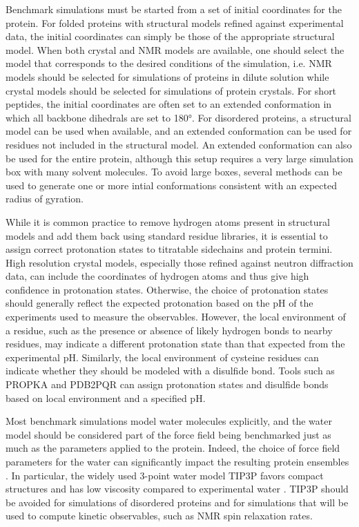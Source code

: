 \documentclass[9pt,review]{livecoms}
\begin{document}
Benchmark simulations must be started from a set of initial coordinates for the protein.
For folded proteins with structural models refined against experimental data, the initial coordinates can simply be those of the appropriate structural model.
When both crystal and NMR models are available, one should select the model that corresponds to the desired conditions of the simulation, i.e. NMR models should be selected for simulations of proteins in dilute solution while crystal models should be selected for simulations of protein crystals.
For short peptides, the initial coordinates are often set to an extended conformation in which all backbone dihedrals are set to \ang{180}.
For disordered proteins, a structural model can be used when available, and an extended conformation can be used for residues not included in the structural model.
An extended conformation can also be used for the entire protein, although this setup requires a very large simulation box with many solvent molecules.
To avoid large boxes, several methods \cite{feldman_fast_2000,feldman_probabilistic_2002,ozenne_flexible-meccano_2012,estana_realistic_2019,ferrie_unified_2020,teixeira_idpconformergenerator_2022} can be used to generate one or more intial conformations consistent with an expected radius of gyration.

While it is common practice to remove hydrogen atoms present in structural models and add them back using standard residue libraries, it is essential to assign correct protonation states to titratable sidechains and protein termini.
High resolution crystal models, especially those refined against neutron diffraction data, can include the coordinates of hydrogen atoms and thus give high confidence in protonation states.
Otherwise, the choice of protonation states should generally reflect the expected protonation based on the pH of the experiments used to measure the observables.
However, the local environment of a residue, such as the presence or absence of likely hydrogen bonds to nearby residues, may indicate a different protonation state than that expected from the experimental pH.
Similarly, the local environment of cysteine residues can indicate whether they should be modeled with a disulfide bond.
Tools such as PROPKA \cite{olsson_propka3_2011} and PDB2PQR \cite{jurrus_improvements_2018} can assign protonation states and disulfide bonds based on local environment and a specified pH.

Most benchmark simulations model water molecules explicitly, and the water model should be considered part of the force field being benchmarked just as much as the parameters applied to the protein.
Indeed, the choice of force field parameters for the water can significantly impact the resulting protein ensembles \cite{piana_water_2015,tian_ff19sb_2020,coppa_accelerated_2023}.
In particular, the widely used 3-point water model TIP3P \cite{jorgensen_comparison_1983} favors compact structures \cite{tian_ff19sb_2020,coppa_accelerated_2023} and has low viscosity compared to experimental water \cite{kadaoluwa_pathirannahalage_systematic_2021}.
TIP3P should be avoided for simulations of disordered proteins and for simulations that will be used to compute kinetic observables, such as NMR spin relaxation rates.
\end{document}
